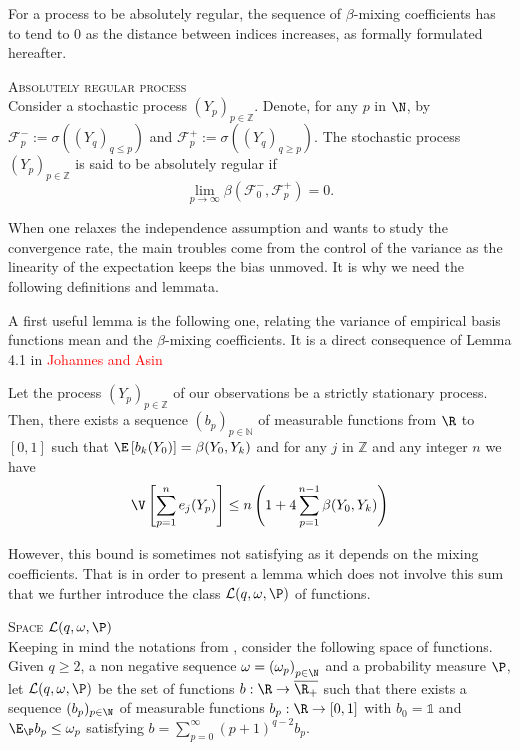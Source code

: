 For a process to be absolutely regular, the sequence of $\beta$-mixing coefficients has to tend to $0$ as the distance between indices increases, as formally formulated hereafter.

\begin{de}{\textsc{Absolutely regular process} \\}
Consider a stochastic process $(Y_{p})_{p \in \mathds{Z}}$.
Denote, for any $p$ in $\N$, by $\mathcal{F}^{-}_{p} := \sigma\left((Y_{q})_{q \leq p}\right)$ and $\mathcal{F}^{+}_{p} := \sigma\left((Y_{q})_{q \geq p}\right)$.
The stochastic process $(Y_{p})_{p \in \mathds{Z}}$ is said to be absolutely regular if
\[\lim\limits_{p \rightarrow \infty} \beta(\mathcal{F}_{0}^{-}, \mathcal{F}_{p}^{+}) = 0.\]
\end{de}

When one relaxes the independence assumption and wants to study the convergence rate, the main troubles come from the control of the variance as the linearity of the expectation keeps the bias unmoved.
It is why we need the following definitions and lemmata.

A first useful lemma is the following one, relating the variance of empirical basis functions mean and the $\beta$-mixing coefficients.
It is a direct consequence of Lemma 4.1 in \textcolor{red}{Johannes and Asin}
\begin{lm}\label{LM_DEPENDENTDATA_VARIANCEBOUNDI}
Let the process $(Y_{p})_{p \in \mathds{Z}}$ of our observations be a strictly stationary process.
Then, there exists a sequence $(b_{p})_{p \in \mathds{N}}$ of measurable functions from $\R$ to $[0, 1]$ such that $\E\left[b_{k}(Y_{0})\right] = \beta(Y_{0}, Y_{k})$ and for any $j$ in $\mathds{Z}$ and any integer $n$ we have
\[\V\left[ \sum\limits_{p = 1}^{n} e_{j}(Y_{p})\right] \leq n \left(1 + 4 \sum\limits_{p = 1}^{n - 1} \beta(Y_{0}, Y_{k})\right)\]
\end{lm}

However, this bound is sometimes not satisfying as it depends on the mixing coefficients.
That is in order to present a lemma which does not involve this sum that we further introduce the class $\mathcal{L}(q, \omega, \P)$ of functions.

\begin{de}{\textsc{Space $\mathcal{L}(q, \omega, \P)$} \\}\label{DE_DEPENDENTDATA_FUNCSPACE}
Keeping in mind the notations from , consider the following space of functions.
Given $q \geq 2$, a non negative sequence $\omega = \left(\omega_{p}\right)_{p \in \N}$ and a probability measure $\P$, let $\mathcal{L}(q, \omega, \P)$ be the set of functions $b : \R \rightarrow \overline{\R_{+}}$ such that there exists a sequence $(b_{p})_{p \in \N}$ of measurable functions $b_{p}: \R \rightarrow [0, 1]$ with $b_{0} = \mathds{1}$ and $\E_{\P} b_{p} \leq \omega_{p}$ satisfying $b = \sum\limits_{p = 0}^{\infty} (p + 1)^{q - 2} b_{p}$.
\end{de}

